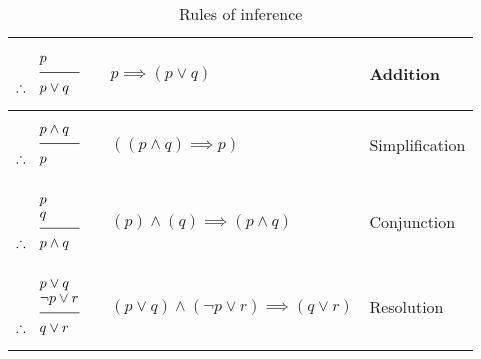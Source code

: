 \begin{table}[H]
\begin{tabular}{m{}m{}m{}}
\begin{equation*}
\setlength{\jot}{-0.05cm}
\begin{aligned}
&p &\\
&\rule[0.1cm]{1cm}{0.5pt} & \\
\therefore \quad & p \vee q & \\
\end{aligned}
\end{equation*} & \(p \implies (p \vee q) \) & Addition \\\midrule

\begin{equation*}
\setlength{\jot}{-0.05cm}
\begin{aligned}
&p \wedge q &\\
&\rule[0.1cm]{1cm}{0.5pt} & \\
\therefore \quad & p& \\
\end{aligned}
\end{equation*} & \( ((p \wedge q ) \implies p) \) & Simplification \\\midrule


\begin{equation*}
\setlength{\jot}{-0.05cm}
\begin{aligned}
&p &\\
&q & \\
&\rule[0.1cm]{1cm}{0.5pt} & \\
\therefore \quad & p \wedge q & \\
\end{aligned}
\end{equation*} & \((p) \wedge (q)  \implies (p \wedge q) \) & Conjunction \\\midrule


\begin{equation*}
\setlength{\jot}{-0.05cm}
\begin{aligned}
&p \vee q&\\
&\neg p \vee r & \\
&\rule[0.1cm]{1cm}{0.5pt} & \\
\therefore \quad & q \vee r & \\
\end{aligned}
\end{equation*} & \((p \vee q) \wedge (\neg p \vee r) \implies (q \vee r) \) & Resolution \\\midrule
\end{tabular}

\caption{Rules of inference}\label{tab:rulesinf}

\end{table}

